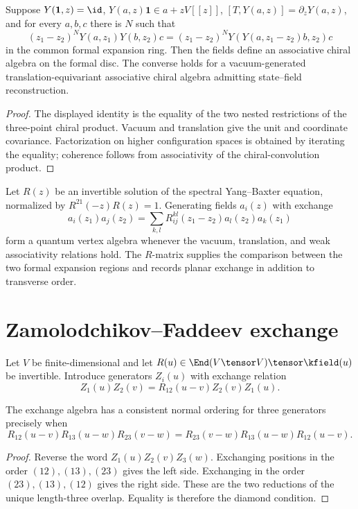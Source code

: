 \begin{proposition}
Suppose $Y(\mathbf1,z)=\id$, $Y(a,z)\mathbf1\in a+zV[[z]]$, $[T,Y(a,z)]=\partial_zY(a,z)$, and for every $a,b,c$ there is $N$ such that
\[
 (z_1-z_2)^N Y(a,z_1)Y(b,z_2)c
 =(z_1-z_2)^N Y(Y(a,z_1-z_2)b,z_2)c
\]
in the common formal expansion ring.  Then the fields define an associative chiral algebra on the formal disc.  The converse holds for a vacuum-generated translation-equivariant associative chiral algebra admitting state--field reconstruction.
\end{proposition}
\begin{proof}
The displayed identity is the equality of the two nested restrictions of the three-point chiral product.  Vacuum and translation give the unit and coordinate covariance.  Factorization on higher configuration spaces is obtained by iterating the equality; coherence follows from associativity of the chiral-convolution product.
\end{proof}

\begin{example}
Let $R(z)$ be an invertible solution of the spectral Yang--Baxter equation, normalized by $R^{21}(-z)R(z)=1$.  Generating fields $a_i(z)$ with exchange
\[
 a_i(z_1)a_j(z_2)
 =\sum_{k,l}R_{ij}^{kl}(z_1-z_2)a_l(z_2)a_k(z_1)
\]
form a quantum vertex algebra whenever the vacuum, translation, and weak associativity relations hold.  The $R$-matrix supplies the comparison between the two formal expansion regions and records planar exchange in addition to transverse order.
\end{example}

\chapter{Zamolodchikov--Faddeev exchange}
Let $V$ be finite-dimensional and let $R(u)\in\End(V\tensor V)\tensor\kfield(u)$ be invertible. Introduce generators $Z_i(u)$ with exchange relation
\[
 Z_1(u)Z_2(v)=R_{12}(u-v)Z_2(v)Z_1(u).
\]

\begin{theorem}
The exchange algebra has a consistent normal ordering for three generators precisely when
\[
 R_{12}(u-v)R_{13}(u-w)R_{23}(v-w)
 =R_{23}(v-w)R_{13}(u-w)R_{12}(u-v).
\]
\end{theorem}
\begin{proof}
Reverse the word $Z_1(u)Z_2(v)Z_3(w)$. Exchanging positions in the order $(12),(13),(23)$ gives the left side. Exchanging in the order $(23),(13),(12)$ gives the right side. These are the two reductions of the unique length-three overlap. Equality is therefore the diamond condition.
\end{proof}

